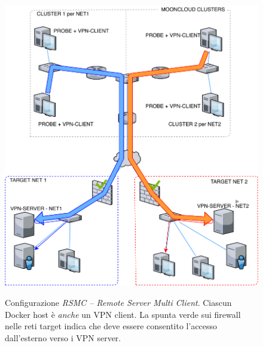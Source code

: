 \begin{figure}[h!]
	\includegraphics[scale=0.55]{img/rsmc}
	\label{fig:rsmc}
	\caption[Configurazione \textit{RSMC -- Remote Server Multi Client}]{Configurazione
		\textit{RSMC -- Remote Server Multi Client}. Ciascun Docker host è \textit{anche} un VPN client.
		La spunta verde sui firewall nelle reti target indica che deve essere consentito l'accesso
	dall'esterno verso i VPN server.}
\end{figure}

